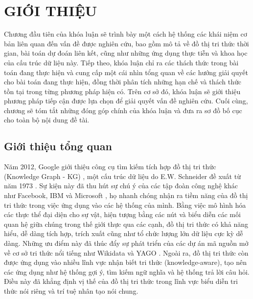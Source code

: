 \chapter{GIỚI THIỆU}
\label{Chapter1}

Chương đầu tiên của khóa luận sẽ trình bày một cách hệ thống các khái
niệm cơ bản liên quan đến vấn đề được nghiên cứu, bao gồm mô tả về đồ
thị tri thức thời gian, bài toán dự đoán liên kết, cũng như những ứng dụng thực tiễn và khoa học của cấu trúc dữ liệu này. Tiếp theo, khóa luận chỉ ra các thách thức trong bài toán đang thực hiện và cung cấp một cái nhìn tổng quan về các hướng giải quyết cho bài toán đang thực hiện, đồng thời phân tích những hạn chế và thách thức tồn tại trong từng phương pháp hiện có. Trên cơ sở đó, khóa luận sẽ giới thiệu phương pháp tiếp cận được lựa chọn để giải quyết vấn đề nghiên cứu. Cuối cùng, chương sẽ tóm tắt những đóng góp chính của khóa luận và đưa ra sơ đồ bố cục cho toàn bộ nội dung đề tài.


\section{Giới thiệu tổng quan}

Năm 2012, Google giới thiệu công cụ tìm kiếm tích hợp đồ thị tri thức (Knowledge Graph - KG) \cite{ref_article01}, một cấu trúc dữ liệu do E.W. Schneider đề xuất từ năm 1973 \cite{ref_article24}. Sự kiện này đã thu hút sự chú ý của các tập đoàn công nghệ khác như Facebook, IBM và Microsoft \cite{ref_article25}, họ nhanh chóng nhận ra tiềm năng của đồ thị tri thức trong việc ứng dụng vào các hệ thống của mình. Bằng việc mô hình hóa các thực thể đại diện cho sự vật, hiện tượng bằng các nút và biểu diễn các mối quan hệ giữa chúng trong thế giới thực qua các cạnh, đồ thị tri thức có khả năng hiểu, dễ dàng tích hợp, trích xuất cũng như tổ chức lượng lớn dữ liệu cực kỳ dễ dàng. Những ưu điểm này đã thúc đẩy sự phát triển của các dự án mã nguồn mở về cơ sở tri thức nổi tiếng như Wikidata \cite{ref_article26} và YAGO \cite{ref_article21}. Ngoài ra, đồ thị tri thức còn được ứng dụng vào nhiều lĩnh vực nhận biết tri thức (knowledge-aware), tạo nên các ứng dụng như hệ thống gợi ý, tìm kiếm ngữ nghĩa và hệ thống trả lời câu hỏi. Điều này đã khẳng định vị thế của đồ thị tri thức trong lĩnh vực biểu diễn tri thức nói riêng và trí tuệ nhân tạo nói chung.

